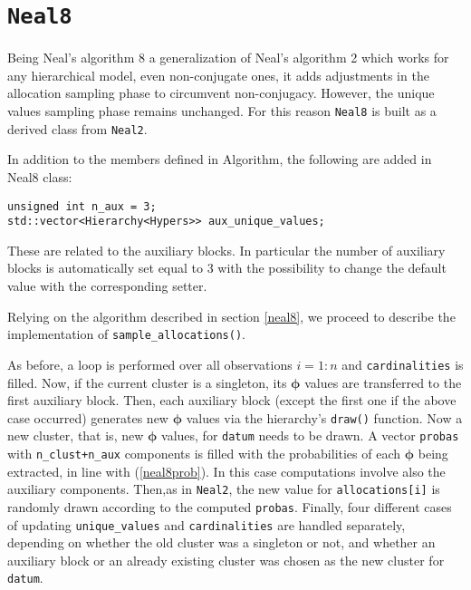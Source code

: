\section{\texttt{Neal8}}

Being Neal's algorithm 8 a generalization of Neal's algorithm 2 which works for any hierarchical model, even non-conjugate ones, it adds adjustments in the allocation sampling phase to circumvent non-conjugacy.
However, the unique values sampling phase remains unchanged. For this reason \verb|Neal8| is built as a derived class from \verb|Neal2|.

In addition to the members defined in Algorithm, the following are added in Neal8 class:
\begin{verbatim}
unsigned int n_aux = 3;
std::vector<Hierarchy<Hypers>> aux_unique_values;
\end{verbatim}
These are related to the auxiliary blocks. In particular the number of auxiliary blocks is automatically set equal to 3 with the possibility to change the default value with the corresponding setter.

Relying on the algorithm described in section \ref{neal8}, we proceed to describe the implementation of \verb|sample_allocations()|.

As before, a loop is performed over all observations $i=1:n$ and \verb|cardinalities| is filled. Now, if the current cluster is a singleton, its $\boldsymbol\phi$ values are transferred to the first auxiliary block. Then, each auxiliary block (except the first one if the above case occurred) generates new $\boldsymbol\phi$ values via the hierarchy's \verb|draw()| function. Now a new cluster, that is, new $\boldsymbol\phi$ values, for \verb|datum| needs to be drawn. 	A vector \verb|probas| with \verb|n_clust+n_aux| components is filled with the probabilities of each $\boldsymbol\phi$ being extracted, in line with (\ref{neal8prob}). In this case computations involve also the auxiliary components. Then,as in \verb|Neal2|, the new value for \verb|allocations[i]| is randomly drawn according to the computed \verb|probas|. Finally, four different cases of updating \verb|unique_values| and \verb|cardinalities| are handled separately, depending on whether the old cluster was a singleton or not, and whether an auxiliary block or an already existing cluster was chosen as the new cluster for \verb|datum|.

